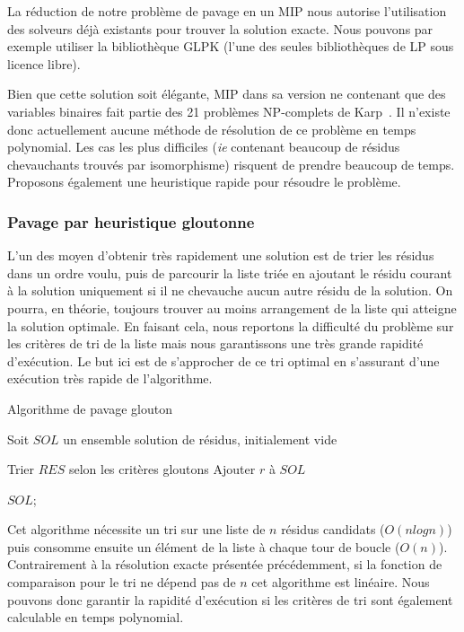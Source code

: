 La réduction de notre problème de pavage en un MIP nous autorise l'utilisation des solveurs déjà existants pour trouver la solution exacte.
Nous pouvons par exemple utiliser la bibliothèque GLPK (l'une des seules bibliothèques de LP sous licence libre).

Bien que cette solution soit élégante, MIP dans sa version ne contenant que des variables binaires fait partie des 21 problèmes NP-complets de Karp~\cite{karp_reducibility_1972}.
Il n'existe donc actuellement aucune méthode de résolution de ce problème en temps polynomial.
Les cas les plus difficiles (\textit{ie} contenant beaucoup de résidus chevauchants trouvés par isomorphisme) risquent de prendre beaucoup de temps.
Proposons également une heuristique rapide pour résoudre le problème.



\subsubsection{Pavage par heuristique gloutonne}

\label{TM_p}

L'un des moyen d'obtenir très rapidement une solution est de trier les résidus dans un ordre voulu, puis de parcourir la liste triée en ajoutant le résidu courant à la solution uniquement si il ne chevauche aucun autre résidu de la solution.
On pourra, en théorie, toujours trouver au moins arrangement de la liste qui atteigne la solution optimale.
En faisant cela, nous reportons la difficulté du problème sur les critères de tri de la liste mais nous garantissons une très grande rapidité d'exécution.
Le but ici est de s'approcher de ce tri optimal en s'assurant d'une exécution très rapide de l'algorithme.


\begin{algorithm}[H]
  \caption{Algorithme de pavage glouton}
  Soit $SOL$ un ensemble solution de résidus, initialement vide\;
  
  Trier $RES$ selon les critères gloutons\;
   {
     {
      Ajouter $r$ à $SOL$\;
    }
  }
  
  \KwRet $SOL$;
\end{algorithm}

Cet algorithme nécessite un tri sur une liste de $n$ résidus candidats ($O(n log n)$) puis consomme ensuite un élément de la
liste à chaque tour de boucle ($O(n)$). Contrairement à la résolution exacte présentée précédemment, si la fonction de comparaison
pour le tri ne dépend pas de $n$ cet algorithme est linéaire.
Nous pouvons donc garantir la rapidité d'exécution si les critères de tri sont également calculable en temps polynomial.

